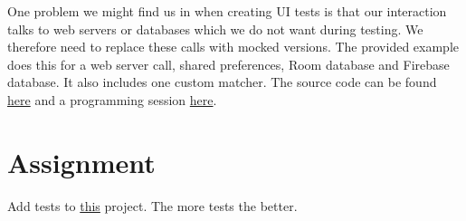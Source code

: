 One problem we might find us in when creating UI tests is that our interaction talks to web servers or databases which we do not want during testing. We therefore need to replace these calls with mocked versions. The provided example does this for a web server call, shared preferences, Room database and Firebase database. It also includes one custom matcher. The source code can be found \href{https://github.com/JonSteinn/AndroidDevelopment/tree/master/examples/lab6/espressotest}{here} and a programming session \href{TODO}{here}.


\section{Assignment}
Add tests to \href{https://github.com/JonSteinn/AndroidDevelopment/raw/master/examples/lab6/test_template.zip}{this} project. The more tests the better.
